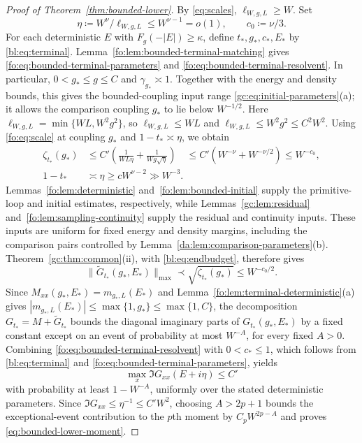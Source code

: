 \documentclass[11pt]{article}
\numberwithin{equation}{section}
\theoremstyle{remark}
\newcommand{\wt}{\widetilde}
\newcommand{\ellstar}{\ell_{W,g,L}}
\begin{document}
\begin{proof}[Proof of Theorem~\ref{thm:bounded-lower}]
By \eqref{eq:scales}, $\ellstar\ge W$. Set
\begin{equation}\label{fo:eq:proof-parameters}
 \eta\coloneqq W^\nu/\ellstar\le W^{\nu-1}=o(1),\qquad
 c_0\coloneqq\nu/3.
\end{equation}
For each deterministic $E$ with $F_g(-|E|)\ge\kappa$,
define $t_*,g_*,c_*,E_*$ by \eqref{bl:eq:terminal}.
Lemma~\ref{fo:lem:bounded-terminal-matching} gives
\eqref{fo:eq:bounded-terminal-parameters} and
\eqref{fo:eq:bounded-terminal-resolvent}.
In particular, $0<g_*\le g\le C$ and $\gamma_{g_*}\asymp1$.
Together with the energy and density bounds, this gives the bounded-coupling
input range \eqref{gc:eq:initial-parameters}(a); it allows the comparison
coupling $g_*$ to lie below $W^{-1/2}$.
Here $\ellstar=\min\{WL,W^2g^2\}$, so
$\ellstar\le WL$ and $\ellstar\le W^2g^2\le C^2W^2$.
Using \eqref{fo:eq:scale} at coupling $g_*$ and $1-t_*\asymp\eta$, we obtain
\begin{equation}\label{bl:eq:endbudget}
 \begin{aligned}
 \zeta_{t_*}(g_*)&\le C'\left(\frac1{WL\eta}+\frac1{Wg\sqrt\eta}\right)\quad
  \le C'(W^{-\nu}+W^{-\nu/2})\le W^{-c_0},\\
 1-t_*&\asymp\eta\ge cW^{\nu-2}\gg W^{-3}.
 \end{aligned}
\end{equation}
Lemmas~\ref{fo:lem:deterministic} and~\ref{fo:lem:bounded-initial}
supply the primitive-loop and initial estimates, respectively, while
Lemmas~\ref{gc:lem:residual} and~\ref{fo:lem:sampling-continuity}
supply the residual and continuity inputs. These inputs are uniform
for fixed energy and density margins, including the comparison pairs
controlled by Lemma~\ref{da:lem:comparison-parameters}(b).
Theorem~\ref{gc:thm:common}(ii), with \eqref{bl:eq:endbudget}, therefore gives
\[
 \|\wt G_{t_*}(g_*,E_*)\|_{\max}
 \prec\sqrt{\zeta_{t_*}(g_*)}\le W^{-c_0/2}.
\]
Since $M_{xx}(g_*,E_*)=m_{g_*,L}(E_*)$ and
Lemma~\ref{fo:lem:terminal-deterministic}(a) gives
$|m_{g_*,L}(E_*)|\le\max\{1,g_*\}\le\max\{1,C\}$,
the decomposition $G_{t_*}=M+\wt G_{t_*}$ bounds the diagonal imaginary
parts of $G_{t_*}(g_*,E_*)$ by a fixed constant except on an event of
probability at most $W^{-A}$, for every fixed $A>0$.
Combining \eqref{fo:eq:bounded-terminal-resolvent} with $0<c_*\le1$,
which follows from \eqref{bl:eq:terminal} and
\eqref{fo:eq:bounded-terminal-parameters}, yields
\begin{equation}\label{fo:eq:bounded-terminal-bound}
 \max_x\Im G_{xx}(E+i\eta)\le C'
\end{equation}
with probability at least $1-W^{-A}$, uniformly over the stated
deterministic parameters.
Since $\Im G_{xx}\le\eta^{-1}\le C'W^2$, choosing $A>2p+1$
bounds the exceptional-event contribution to the $p$th moment by
$C_pW^{2p-A}$ and proves \eqref{eq:bounded-lower-moment}.
\end{proof}
\end{document}

